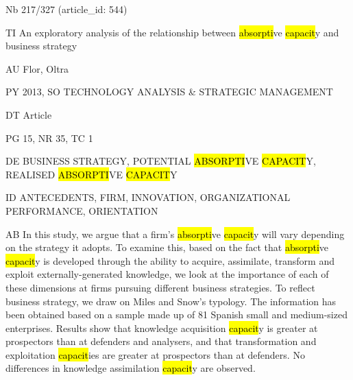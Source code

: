 \documentclass[a4paper]{article}
\begin{document}
\vspace*{-2cm}
Nb \tabto{0cm}217/327 (article\_id: 544)\par
TI \tabto{0cm}An exploratory analysis of the relationship between \hl{absorpti}ve \hl{capacit}y and business strategy\par
AU \tabto{0cm}Flor, Oltra\par
PY \tabto{0cm}2013, SO TECHNOLOGY ANALYSIS \& STRATEGIC MANAGEMENT\par
DT \tabto{0cm}Article\par
PG \tabto{0cm}15, NR 35, TC 1\par
DE \tabto{0cm}BUSINESS STRATEGY, POTENTIAL \hl{ABSORPTI}VE \hl{CAPACIT}Y, REALISED \hl{ABSORPTI}VE \hl{CAPACIT}Y\par
ID \tabto{0cm}ANTECEDENTS, FIRM, INNOVATION, ORGANIZATIONAL PERFORMANCE, ORIENTATION\par
AB \tabto{0cm}In this study, we argue that a firm's \hl{absorpti}ve \hl{capacit}y will vary depending on the strategy it adopts. To examine this, based on the fact that \hl{absorpti}ve \hl{capacit}y is developed through the ability to acquire, assimilate, transform and exploit externally-generated knowledge, we look at the importance of each of these dimensions at firms pursuing different business strategies. To reflect business strategy, we draw on Miles and Snow's typology. The information has been obtained based on a sample made up of 81 Spanish small and medium-sized enterprises. Results show that knowledge acquisition \hl{capacit}y is greater at prospectors than at defenders and analysers, and that transformation and exploitation \hl{capacit}ies are greater at prospectors than at defenders. No differences in knowledge assimilation \hl{capacit}y are observed.\par
\clearpage
\end{document}
